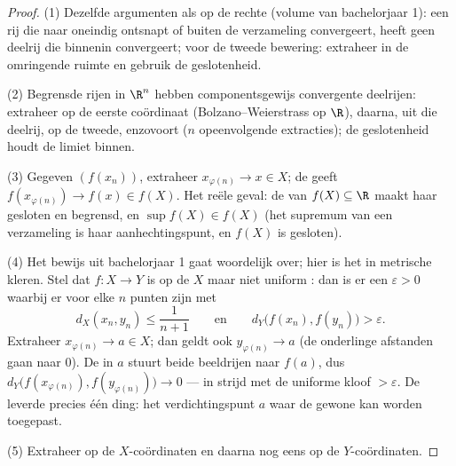 \begin{proof}
(1) Dezelfde argumenten als op de rechte (volume van bachelorjaar
1): een rij die naar oneindig ontsnapt of buiten de verzameling
convergeert, heeft geen deelrij die binnenin convergeert; voor de
tweede bewering: extraheer in de omringende  ruimte en
gebruik de geslotenheid.

(2) Begrensde rijen in $\R^n$ hebben componentsgewijs convergente
deelrijen: extraheer op de eerste coördinaat
(Bolzano--Weierstrass op $\R$), daarna, uit die deelrij, op de
tweede, enzovoort ($n$ opeenvolgende extracties); de geslotenheid
houdt de limiet binnen.

(3) Gegeven $(f(x_n))$, extraheer $x_{\varphi(n)} \to x \in X$; de
 geeft $f(x_{\varphi(n)}) \to f(x) \in f(X)$. Het reële
geval: de  van $f(X) \subseteq \R$ maakt haar gesloten
en begrensd, en $\sup f(X) \in f(X)$ (het supremum van een
verzameling is haar aanhechtingspunt, en $f(X)$ is gesloten).

(4) Het bewijs uit bachelorjaar 1 gaat woordelijk over; hier is het
in metrische kleren. Stel dat $f \colon X \to Y$  is op de
 $X$ maar niet uniform : dan is er een $\varepsilon
> 0$ waarbij er voor elke $n$ punten zijn met
\[
d_X(x_n, y_n) \leq \frac{1}{n+1}
\qquad\text{en}\qquad
d_Y\bigl(f(x_n), f(y_n)\bigr) > \varepsilon .
\]
Extraheer $x_{\varphi(n)} \to a \in X$; dan geldt ook
$y_{\varphi(n)} \to a$ (de onderlinge afstanden gaan naar $0$). De
 in $a$ stuurt beide beeldrijen naar $f(a)$, dus
$d_Y\bigl(f(x_{\varphi(n)}), f(y_{\varphi(n)})\bigr) \to 0$ --- in
strijd met de uniforme kloof $> \varepsilon$. De 
leverde precies één ding: het verdichtingspunt $a$ waar de gewone
 kan worden toegepast.

(5) Extraheer op de $X$-coördinaten en daarna nog eens op de
$Y$-coördinaten.
\end{proof}

